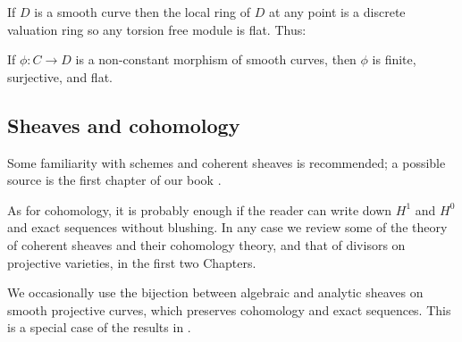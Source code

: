 If $D$ is a 
smooth curve then the local ring of $D$ at any point is a discrete valuation ring so any torsion free module is flat. 
Thus:

\begin{proposition}
If $\phi: C\to D$ is a non-constant morphism of smooth curves, then $\phi$ is finite, surjective, and flat.
\end{proposition}

\subsection {Sheaves and cohomology} 

Some familiarity with schemes and coherent sheaves is recommended; a possible source is
the first chapter of our book \cite{GeomSchemes}.

As for cohomology, it is probably enough if the reader can write down $H^1$ and $H^0$ and exact sequences without blushing.
In any case we review some of the theory of coherent sheaves and their cohomology theory, and that of divisors on projective 
varieties, in the first two Chapters. 

We occasionally use the bijection between algebraic and analytic sheaves on smooth projective curves, which preserves
cohomology and exact sequences. This is a special case of the results in \cite{GAGA}. 


